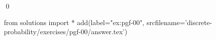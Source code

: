 
\begin{ex} 
  \label{ex:pgf-00}
  
  \qed
\end{ex} 
\begin{python0}
from solutions import *
add(label="ex:pgf-00",
    srcfilename='discrete-probability/exercises/pgf-00/answer.tex') 
\end{python0}
